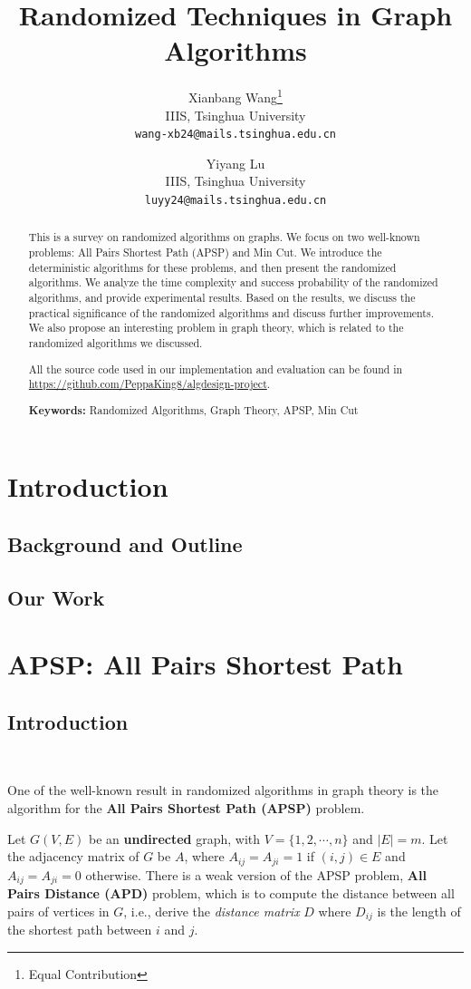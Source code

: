 \documentclass[11pt]{article}
\title{Randomized Techniques in Graph Algorithms}
\author{
    Xianbang Wang\thanks{Equal Contribution} \\
    \fontsize{13}{12}\selectfont
    IIIS, Tsinghua University \\
    \fontsize{13}{12}\selectfont
    \texttt{wang-xb24@mails.tsinghua.edu.cn}
    \and
    Yiyang Lu\footnotemark[1] \\
    \fontsize{13}{12}\selectfont
    IIIS, Tsinghua University \\
    \fontsize{13}{12}\selectfont
    \texttt{luyy24@mails.tsinghua.edu.cn}
}
\date{}
\theoremstyle{plain}
\begin{document}
\maketitle
\begin{abstract}
    This is a survey on randomized algorithms on graphs. We focus on two well-known problems: All Pairs Shortest Path (APSP) and Min Cut. We introduce the deterministic algorithms for these problems, and then present the randomized algorithms. We analyze the time complexity and success probability of the randomized algorithms, and provide experimental results. Based on the results, we discuss the practical significance of the randomized algorithms and discuss further improvements. We also propose an interesting problem in graph theory, which is related to the randomized algorithms we discussed.
    
    All the source code used in our implementation and evaluation can be found in \url{https://github.com/PeppaKing8/algdesign-project}.

    \textbf{Keywords:} Randomized Algorithms, Graph Theory, APSP, Min Cut
\end{abstract}

\tableofcontents


\section{Introduction}
\subsection{Background and Outline}
\subsection{Our Work}

\section{APSP: All Pairs Shortest Path}
\subsection{Introduction}\

One of the well-known result in randomized algorithms in graph theory is the algorithm for the \textbf{All Pairs Shortest Path (APSP)} problem.

Let $G(V,E)$ be an \textbf{undirected} graph, with $V=\{1,2,\cdots,n\}$ and $|E|=m$. Let the adjacency matrix of $G$ be $A$, where $A_{ij}=A_{ji}=1$ if $(i,j)\in E$ and $A_{ij}=A_{ji}=0$ otherwise. There is a weak version of the APSP problem, \textbf{All Pairs Distance (APD)} problem, which is to compute the distance between all pairs of vertices in $G$, i.e., derive the \emph{distance matrix} $D$ where $D_{ij}$ is the length of the shortest path between $i$ and $j$.
\end{document}
